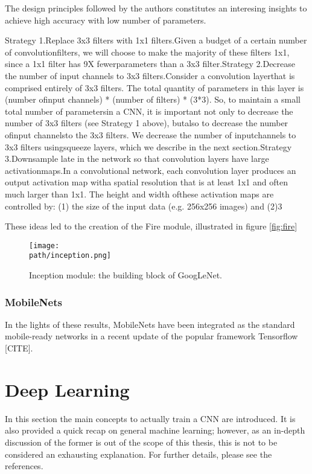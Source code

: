 The design principles followed by the authors constitutes an interesing insights to achieve high accuracy with low number of parameters.  

Strategy 1.Replace 3x3 filters with 1x1 filters.Given a budget of a certain number of convolutionfilters,  we will choose to make the majority of these filters 1x1,  since a 1x1 filter has 9X fewerparameters than a 3x3 filter.Strategy 2.Decrease the number of input channels to 3x3 filters.Consider a convolution layerthat is comprised entirely of 3x3 filters. The total quantity of parameters in this layer is (number ofinput channels) * (number of filters) * (3*3).  So, to maintain a small total number of parametersin a CNN, it is important not only to decrease the number of 3x3 filters (see Strategy 1 above), butalso to decrease the number ofinput channelsto the 3x3 filters.  We decrease the number of inputchannels to 3x3 filters usingsqueeze layers, which we describe in the next section.Strategy 3.Downsample late in the network so that convolution layers have large activationmaps.In a convolutional network, each convolution layer produces an output activation map witha spatial resolution that is at least 1x1 and often much larger than 1x1.  The height and width ofthese activation maps are controlled by: (1) the size of the input data (e.g. 256x256 images) and (2)3

These ideas led to the creation of the Fire module, illustrated in figure \ref{fig:fire}

\begin{figure}[h!]
 \centering
 \texttt{[image: \\path/inception.png]} 
 \caption{Inception module: the building block of GoogLeNet.}
 \label{fig:inception}
\end{figure}


\subsubsection{MobileNets}
 In the lights of these results, MobileNets have been integrated as the standard mobile-ready networks in a recent update of the popular framework Tensorflow [CITE].



\section{Deep Learning}
In this section the main concepts to actually train a CNN are introduced. It is also provided a quick recap on general machine learning; however, as an in-depth discussion of the former is out of the scope of this thesis, this is not to be considered an exhausting explanation. For further details, please see the references. 


